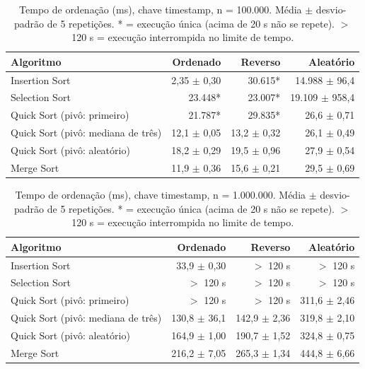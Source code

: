 \begin{table}[ht]
\centering
\caption{Tempo de ordena\c{c}\~ao (ms), chave timestamp, n = 100.000. M\'edia $\pm$ desvio-padr\~ao de 5 repeti\c{c}\~oes. * = execu\c{c}\~ao \'unica (acima de 20 s n\~ao se repete). $>$ 120 s = execu\c{c}\~ao interrompida no limite de tempo. }
\label{tab:tempo-timestamp-100000}
\begin{tabular}{lrrr}
\hline
Algoritmo & Ordenado & Reverso & Aleat\'orio \\
\hline
Insertion Sort & 2,35 $\pm$ 0,30 & 30.615* & 14.988 $\pm$ 96,4 \\
Selection Sort & 23.448* & 23.007* & 19.109 $\pm$ 958,4 \\
Quick Sort (piv\^o: primeiro) & 21.787* & 29.835* & 26,6 $\pm$ 0,71 \\
Quick Sort (piv\^o: mediana de tr\^es) & 12,1 $\pm$ 0,05 & 13,2 $\pm$ 0,32 & 26,1 $\pm$ 0,49 \\
Quick Sort (piv\^o: aleat\'orio) & 18,2 $\pm$ 0,29 & 19,5 $\pm$ 0,96 & 27,9 $\pm$ 0,54 \\
Merge Sort & 11,9 $\pm$ 0,36 & 15,6 $\pm$ 0,21 & 29,5 $\pm$ 0,69 \\
\hline
\end{tabular}
\end{table}

\begin{table}[ht]
\centering
\caption{Tempo de ordena\c{c}\~ao (ms), chave timestamp, n = 1.000.000. M\'edia $\pm$ desvio-padr\~ao de 5 repeti\c{c}\~oes. * = execu\c{c}\~ao \'unica (acima de 20 s n\~ao se repete). $>$ 120 s = execu\c{c}\~ao interrompida no limite de tempo. }
\label{tab:tempo-timestamp-1000000}
\begin{tabular}{lrrr}
\hline
Algoritmo & Ordenado & Reverso & Aleat\'orio \\
\hline
Insertion Sort & 33,9 $\pm$ 0,30 & $>$ 120 s & $>$ 120 s \\
Selection Sort & $>$ 120 s & $>$ 120 s & $>$ 120 s \\
Quick Sort (piv\^o: primeiro) & $>$ 120 s & $>$ 120 s & 311,6 $\pm$ 2,46 \\
Quick Sort (piv\^o: mediana de tr\^es) & 130,8 $\pm$ 36,1 & 142,9 $\pm$ 2,36 & 319,8 $\pm$ 2,10 \\
Quick Sort (piv\^o: aleat\'orio) & 164,9 $\pm$ 1,00 & 190,7 $\pm$ 1,52 & 324,8 $\pm$ 0,75 \\
Merge Sort & 216,2 $\pm$ 7,05 & 265,3 $\pm$ 1,34 & 444,8 $\pm$ 6,66 \\
\hline
\end{tabular}
\end{table}

